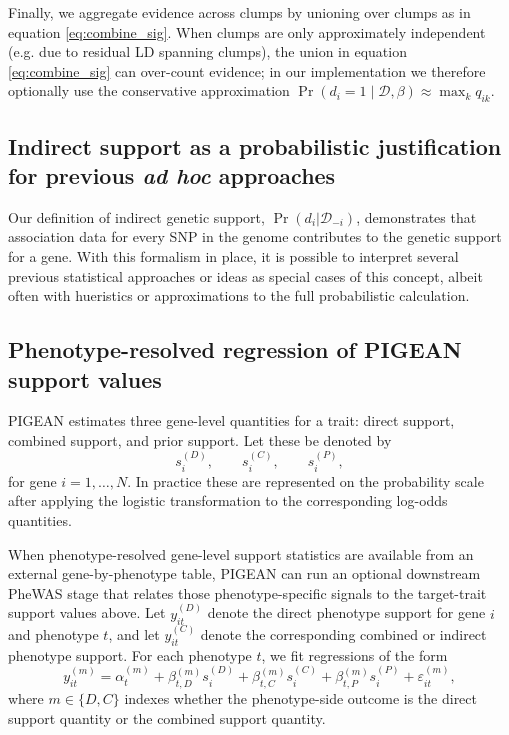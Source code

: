 \documentclass[11pt]{article}
\begin{document}
Finally, we aggregate evidence across clumps by unioning over clumps as in
equation \eqref{eq:combine_sig}. When clumps are only approximately independent
(e.g. due to residual LD spanning clumps), the union in
equation \eqref{eq:combine_sig} can over-count evidence; in our implementation
we therefore optionally use the conservative approximation
$\Pr(d_i=1 \mid \mathcal{D},\beta) \approx \max_k q_{ik}$.


\subsection{Indirect support as a probabilistic justification for
  previous \textit{ad hoc} approaches}

Our definition of indirect genetic support,
$\Pr\left(d_i|\mathcal{D}_{-i}\right)$, demonstrates that association
data for every SNP in the genome contributes to the genetic support
for a gene. With this formalism in place, it is possible to interpret
several previous statistical approaches or ideas as special cases of
this concept, albeit often with hueristics or approximations to the
full probabilistic calculation.

\subsection{Phenotype-resolved regression of PIGEAN support values}
PIGEAN estimates three gene-level quantities for a trait: direct support, combined support, and prior support. Let these be denoted by
\[
s_i^{(D)}, \qquad s_i^{(C)}, \qquad s_i^{(P)},
\]
for gene $i = 1,\ldots,N$. In practice these are represented on the probability scale after applying the logistic transformation to the corresponding log-odds quantities.

When phenotype-resolved gene-level support statistics are available from an external gene-by-phenotype table, PIGEAN can run an optional downstream PheWAS stage that relates those phenotype-specific signals to the target-trait support values above. Let $y_{it}^{(D)}$ denote the direct phenotype support for gene $i$ and phenotype $t$, and let $y_{it}^{(C)}$ denote the corresponding combined or indirect phenotype support. For each phenotype $t$, we fit regressions of the form
\begin{equation}
y_{it}^{(m)}
=
\alpha_t^{(m)}
+
\beta_{t,D}^{(m)} s_i^{(D)}
+
\beta_{t,C}^{(m)} s_i^{(C)}
+
\beta_{t,P}^{(m)} s_i^{(P)}
+
\varepsilon_{it}^{(m)},
\label{eq:phewas_support_regression}
\end{equation}
where $m \in \{D, C\}$ indexes whether the phenotype-side outcome is the direct support quantity or the combined support quantity.
\end{document}
